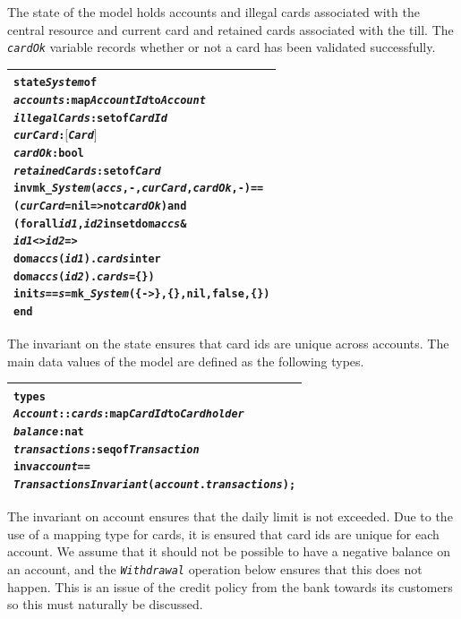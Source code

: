 \documentclass[\pformat,12pt,twoside]{article}
\newenvironment{VDMgray}%
{\begin{tabular}{|G|}\hline\small\begin{alltt}}%
{\end{alltt}\normalsize\\
 \hline\end{tabular}}
\begin{document}
The state of the model holds accounts and illegal cards associated 
with the central resource and current card and retained cards 
associated with the till. The \texttt{\emph{cardOk}} variable records whether 
or not a card has been validated successfully. 

\begin{VDMgray}
\textbf{state} \textit{System} \textbf{of}
 \textit{accounts} : \textbf{map} \textit{AccountId} \textbf{to} \textit{Account}
 \textit{illegalCards} : \textbf{set} \textbf{of} \textit{CardId}
 \textit{curCard} : \ensuremath{[}\textit{Card}\ensuremath{]}
 \textit{cardOk} : \textbf{bool}
 \textit{retainedCards} : \textbf{set} \textbf{of} \textit{Card}
\textbf{inv} \textbf{mk\_}\textit{System}(\textit{accs},-,\textit{curCard},\textit{cardOk},-) ==
   (\textit{curCard} = \textbf{nil} =\texttt{>} \textbf{not} \textit{cardOk}) \textbf{and}
   (\textbf{forall} \textit{id1}, \textit{id2} \textbf{in set} \textbf{dom} \textit{accs} \&
        \textit{id1} \texttt{<}\texttt{>} \textit{id2} =\texttt{>}
        \textbf{dom} \textit{accs}(\textit{id1}).\textit{cards} \textbf{inter}
        \textbf{dom} \textit{accs}(\textit{id2}).\textit{cards} = \{\})
\textbf{init} \textit{s} == \textit{s} = \textbf{mk\_}\textit{System}(\{{\textbar}-\texttt{>}\},\{\},\textbf{nil},\textbf{false},\{\})
\textbf{end}
\end{VDMgray}

The invariant on the state ensures that card ids are unique across 
accounts. The main data values of the model are defined as the 
following types.

\begin{VDMgray}
\textbf{types}
 \textit{Account} :: \textit{cards} : \textbf{map} \textit{CardId} \textbf{to} \textit{Cardholder}
            \textit{balance} : \textbf{nat}
            \textit{transactions} : \textbf{seq} \textbf{of} \textit{Transaction}
 \textbf{inv} \textit{account} == 
        \textit{TransactionsInvariant}(\textit{account}.\textit{transactions});
\end{VDMgray}


The invariant on account ensures that the daily limit is not 
exceeded. Due to the use of a mapping type for cards, it is ensured 
that card ids are unique for each account. We assume that it 
should not be possible to have a negative balance on an account, 
and the \texttt{\emph{Withdrawal}} operation below ensures that this does not 
happen. This is an issue of the credit policy from the bank towards
its customers so this must naturally be discussed.
\end{document}
